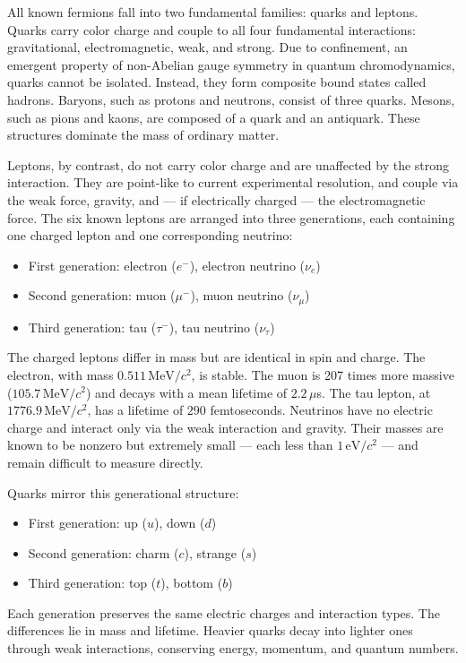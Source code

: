 All known fermions fall into two fundamental families: quarks and leptons. Quarks carry color charge and couple to all four fundamental interactions: gravitational, electromagnetic, weak, and strong. Due to confinement, an emergent property of non-Abelian gauge symmetry in quantum chromodynamics, quarks cannot be isolated. Instead, they form composite bound states called hadrons. Baryons, such as protons and neutrons, consist of three quarks. Mesons, such as pions and kaons, are composed of a quark and an antiquark. These structures dominate the mass of ordinary matter.

Leptons, by contrast, do not carry color charge and are unaffected by the strong interaction. They are point-like to current experimental resolution, and couple via the weak force, gravity, and — if electrically charged — the electromagnetic force. The six known leptons are arranged into three generations, each containing one charged lepton and one corresponding neutrino:
\begin{itemize}
\item First generation: electron ($e^-$), electron neutrino ($\nu_e$)
\item Second generation: muon ($\mu^-$), muon neutrino ($\nu_\mu$)
\item Third generation: tau ($\tau^-$), tau neutrino ($\nu_\tau$)
\end{itemize}

The charged leptons differ in mass but are identical in spin and charge. The electron, with mass $0.511\,\text{MeV}/c^2$, is stable. The muon is 207 times more massive ($105.7\,\text{MeV}/c^2$) and decays with a mean lifetime of $2.2\,\mu$s. The tau lepton, at $1776.9\,\text{MeV}/c^2$, has a lifetime of $290$ femtoseconds. Neutrinos have no electric charge and interact only via the weak interaction and gravity. Their masses are known to be nonzero but extremely small — each less than $1\,\text{eV}/c^2$ — and remain difficult to measure directly.

Quarks mirror this generational structure:
\begin{itemize}
\item First generation: up ($u$), down ($d$)
\item Second generation: charm ($c$), strange ($s$)
\item Third generation: top ($t$), bottom ($b$)
\end{itemize}
Each generation preserves the same electric charges and interaction types. The differences lie in mass and lifetime. Heavier quarks decay into lighter ones through weak interactions, conserving energy, momentum, and quantum numbers.

